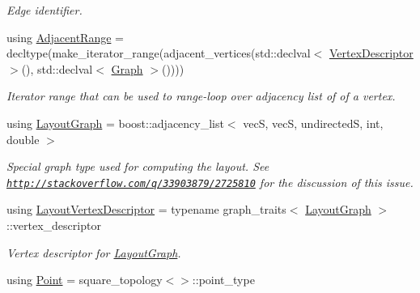 \begin{DoxyCompactItemize}
\begin{DoxyCompactList}\small\item\em Edge identifier. \end{DoxyCompactList}\item 
using \hyperlink{structslb_1_1core_1_1ui_1_1StateGraph_a2ba22d3efc94008c1ad2ed7f338e2fa9}{Adjacent\+Range} = decltype(make\+\_\+iterator\+\_\+range(adjacent\+\_\+vertices(std\+::declval$<$ \hyperlink{structslb_1_1core_1_1ui_1_1StateGraph_ab2d88fce7d30dc6346910900212a7e6d}{Vertex\+Descriptor} $>$(), std\+::declval$<$ \hyperlink{structslb_1_1core_1_1ui_1_1StateGraph_af2cacea8f7165ee45140ff842a243c90}{Graph} $>$())))\hypertarget{structslb_1_1core_1_1ui_1_1StateGraph_a2ba22d3efc94008c1ad2ed7f338e2fa9}{}\label{structslb_1_1core_1_1ui_1_1StateGraph_a2ba22d3efc94008c1ad2ed7f338e2fa9}

\begin{DoxyCompactList}\small\item\em Iterator range that can be used to range-\/loop over adjacency list of of a vertex. \end{DoxyCompactList}\item 
using \hyperlink{structslb_1_1core_1_1ui_1_1StateGraph_a891b8f21d1affa3c2d7f6d1ca008a48d}{Layout\+Graph} = boost\+::adjacency\+\_\+list$<$ vecS, vecS, undirectedS, int, double $>$\hypertarget{structslb_1_1core_1_1ui_1_1StateGraph_a891b8f21d1affa3c2d7f6d1ca008a48d}{}\label{structslb_1_1core_1_1ui_1_1StateGraph_a891b8f21d1affa3c2d7f6d1ca008a48d}

\begin{DoxyCompactList}\small\item\em Special graph type used for computing the layout. See \href{http://stackoverflow.com/q/33903879/2725810}{\tt http\+://stackoverflow.\+com/q/33903879/2725810} for the discussion of this issue. \end{DoxyCompactList}\item 
using \hyperlink{structslb_1_1core_1_1ui_1_1StateGraph_ac4690596402a1b99f516532605a961d5}{Layout\+Vertex\+Descriptor} = typename graph\+\_\+traits$<$ \hyperlink{structslb_1_1core_1_1ui_1_1StateGraph_a891b8f21d1affa3c2d7f6d1ca008a48d}{Layout\+Graph} $>$\+::vertex\+\_\+descriptor\hypertarget{structslb_1_1core_1_1ui_1_1StateGraph_ac4690596402a1b99f516532605a961d5}{}\label{structslb_1_1core_1_1ui_1_1StateGraph_ac4690596402a1b99f516532605a961d5}

\begin{DoxyCompactList}\small\item\em Vertex descriptor for \hyperlink{structslb_1_1core_1_1ui_1_1StateGraph_a891b8f21d1affa3c2d7f6d1ca008a48d}{Layout\+Graph}. \end{DoxyCompactList}\item 
using \hyperlink{structslb_1_1core_1_1ui_1_1StateGraph_a86d2316b03ddf9f3da4d6255d20a39d8}{Point} = square\+\_\+topology$<$$>$\+::point\+\_\+type\hypertarget{structslb_1_1core_1_1ui_1_1StateGraph_a86d2316b03ddf9f3da4d6255d20a39d8}{}\label{structslb_1_1core_1_1ui_1_1StateGraph_a86d2316b03ddf9f3da4d6255d20a39d8}


\end{DoxyCompactItemize}
